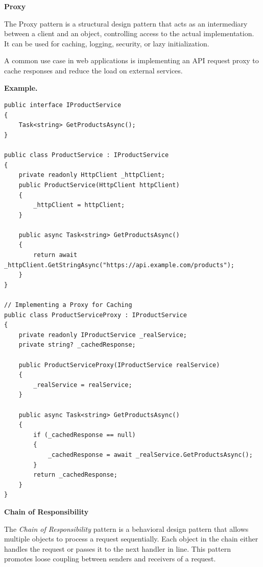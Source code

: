 \medskip
\begin{center}
\textbf{Proxy}
\end{center}



The Proxy pattern is a structural design pattern that acts as an intermediary between a client and an object, controlling access to the actual implementation. It can be used for caching, logging, security, or lazy initialization.

A common use case in web applications is implementing an API request proxy to cache responses and reduce the load on external services.

\textbf{Example.}

\begin{lstlisting}
public interface IProductService
{
    Task<string> GetProductsAsync();
}

public class ProductService : IProductService
{
    private readonly HttpClient _httpClient;
    public ProductService(HttpClient httpClient)
    {
        _httpClient = httpClient;
    }

    public async Task<string> GetProductsAsync()
    {
        return await _httpClient.GetStringAsync("https://api.example.com/products");
    }
}

// Implementing a Proxy for Caching
public class ProductServiceProxy : IProductService
{
    private readonly IProductService _realService;
    private string? _cachedResponse;

    public ProductServiceProxy(IProductService realService)
    {
        _realService = realService;
    }

    public async Task<string> GetProductsAsync()
    {
        if (_cachedResponse == null)
        {
            _cachedResponse = await _realService.GetProductsAsync();
        }
        return _cachedResponse;
    }
}

\end{lstlisting}






\medskip
\begin{center}
\textbf{Chain of Responsibility}
\end{center}

The \textit{Chain of Responsibility} pattern is a behavioral design pattern that allows multiple objects to process a request sequentially. Each object in the chain either handles the request or passes it to the next handler in line. This pattern promotes loose coupling between senders and receivers of a request.


